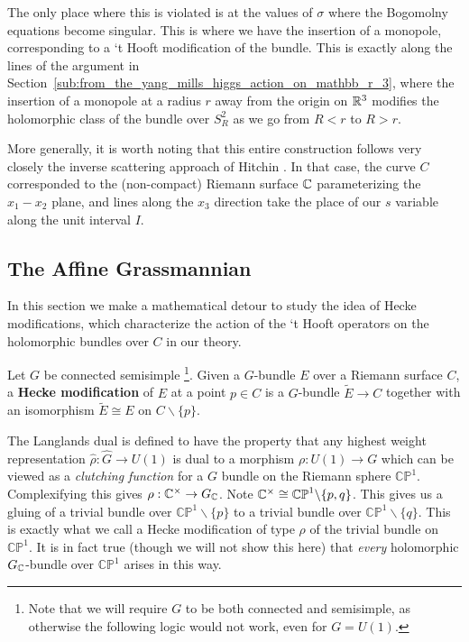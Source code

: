 	 The only place where this is violated is at the values of $\sigma$ where the Bogomolny equations become singular. This is where we have the insertion of a monopole, corresponding to a `t Hooft modification of the bundle. This is exactly along the lines of the argument in Section~\ref{sub:from_the_yang_mills_higgs_action_on_mathbb_r_3}, where the insertion of a monopole at a radius $r$ away from the origin on $\mathbb{R}^3$ modifies the holomorphic class of the bundle over $S^2_R$ as we go from $R < r$ to $R > r$. 
	 
	 
	 More generally, it is worth noting that this entire construction follows very closely the inverse scattering approach of Hitchin \cite{hitchin1982, atiyahhitchin1988}. In that case, the curve $C$ corresponded to the (non-compact) Riemann surface $\mathbb{C}$ parameterizing the $x_1-x_2$ plane, and lines along the $x_3$ direction take the place of our $s$ variable along the unit interval $I$.
	
	\subsection{The Affine Grassmannian}

	In this section we make a mathematical detour to study the idea of Hecke modifications, which characterize the action of the `t Hooft operators on the holomorphic bundles over $C$ in our theory.
	
	\begin{defn}
		Let $G$ be connected semisimple \footnote{Note that we will require $G$ to be both connected and semisimple, as otherwise the following logic would not work, even for $G=U(1)$.}. Given a $G$-bundle $E$ over a Riemann surface $C$, a \textbf{Hecke modification} of $E$ at a point $p \in C$ is a $G$-bundle $\tilde E \to C$ together with an isomorphism $\tilde E \cong E$ on $C \backslash \{p \}$.
	\end{defn}
	
	
	\begin{obs}\label{obs:hecke}
			The Langlands dual is defined to have the property that any highest weight representation $\hat \rho: \hat G \to U(1)$ is dual to a morphism $\rho: U(1) \to G$ which can be viewed as a \emph{clutching function} for a $G$ bundle on the Riemann sphere $\mathbb{CP}^1$. Complexifying this gives $\rho: \mathbb{C}^\times \to G_{\mathbb{C}}$. Note $\mathbb{C}^\times \cong \mathbb{CP}^1 \backslash \{p, q \}$. This gives us a gluing of a trivial bundle over $\mathbb{CP}^1 \backslash \{p \}$ to a trivial bundle over $\mathbb{CP}^1 \backslash \{q \}$. This is exactly what we call a Hecke modification of type $\rho$ of the trivial bundle on $\mathbb{CP}^1$. It is in fact true (though we will not show this here) that \emph{every} holomorphic $G_{\mathbb{C}}$-bundle over $\mathbb{CP}^1$ arises in this way.
	\end{obs}

